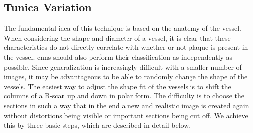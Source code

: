 \subsection{Tunica Variation}

The fundamental idea of this technique is based on the anatomy of the vessel. When considering the shape and diameter of a vessel, it is clear that these characteristics do not directly correlate with whether or not plaque is present in the vessel. \acrshort{cnn}s should also perform their classification as independently as possible. Since generalization is increasingly difficult with a smaller number of images, it may be advantageous to be able to randomly change the shape of the vessels. The easiest way to adjust the shape fit of the vessels is to shift the columns of a B-scan up and down in polar form. The difficulty is to choose the sections in such a way that in the end a new and realistic image is created again without distortions being visible or important sections being cut off. We achieve this by three basic steps, which are described in detail below.

